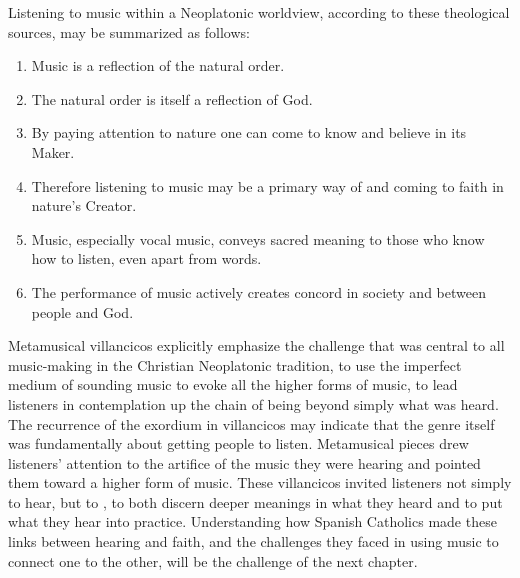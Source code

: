 Listening to music within a Neoplatonic worldview, according to these
theological sources, may be summarized as follows:
\begin{enumerate}
\item Music is a reflection of the natural order.
\item The natural order is itself a reflection of God.
\item By paying attention to nature one can come to know and believe in its
    Maker.
\item Therefore listening to music may be a primary way of  and coming to faith in nature's Creator.
\item Music, especially vocal music, conveys sacred meaning to those who know
    how to listen, even apart from words.
\item The performance of music actively creates concord in society and between
    people and God.  
\end{enumerate}

Metamusical villancicos explicitly emphasize the challenge that was central to
all music-making in the Christian Neoplatonic tradition, to use the imperfect
medium of sounding music to evoke all the higher forms of music, to lead
listeners in contemplation up the chain of being beyond simply what was heard.
The recurrence of the  exordium in villancicos may indicate
that the genre itself was fundamentally about getting people to listen.
Metamusical pieces drew listeners' attention to the artifice of the music they
were hearing and pointed them toward a higher form of music.
These villancicos invited listeners not simply to hear, but to , to both discern deeper meanings in what they heard and to
put what they hear into practice.
Understanding how Spanish Catholics made these links between hearing and faith,
and the challenges they faced in using music to connect one to the other, will
be the challenge of the next chapter.

\endinput
